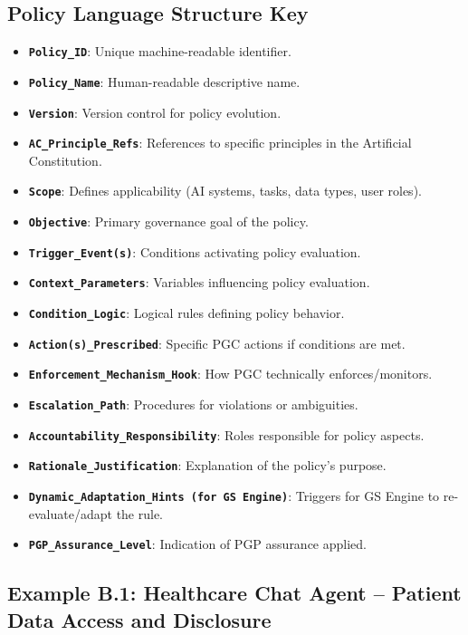 \documentclass[sigconf,review,anonymous=false]{acmart} %
\begin{document}
\subsection{Policy Language Structure Key}
\label{app:policy_examples_structure}
\begin{itemize}
    \item \textbf{\texttt{Policy\_ID}}: Unique machine-readable identifier.
    \item \textbf{\texttt{Policy\_Name}}: Human-readable descriptive name.
    \item \textbf{\texttt{Version}}: Version control for policy evolution.
    \item \textbf{\texttt{AC\_Principle\_Refs}}: References to specific principles in the Artificial Constitution.
    \item \textbf{\texttt{Scope}}: Defines applicability (AI systems, tasks, data types, user roles).
    \item \textbf{\texttt{Objective}}: Primary governance goal of the policy.
    \item \textbf{\texttt{Trigger\_Event(s)}}: Conditions activating policy evaluation.
    \item \textbf{\texttt{Context\_Parameters}}: Variables influencing policy evaluation.
    \item \textbf{\texttt{Condition\_Logic}}: Logical rules defining policy behavior.
    \item \textbf{\texttt{Action(s)\_Prescribed}}: Specific PGC actions if conditions are met.
    \item \textbf{\texttt{Enforcement\_Mechanism\_Hook}}: How PGC technically enforces/monitors.
    \item \textbf{\texttt{Escalation\_Path}}: Procedures for violations or ambiguities.
    \item \textbf{\texttt{Accountability\_Responsibility}}: Roles responsible for policy aspects.
    \item \textbf{\texttt{Rationale\_Justification}}: Explanation of the policy's purpose.
    \item \textbf{\texttt{Dynamic\_Adaptation\_Hints (for GS Engine)}}: Triggers for GS Engine to re-evaluate/adapt the rule.
    \item \textbf{\texttt{PGP\_Assurance\_Level}}: Indication of PGP assurance applied.
\end{itemize}

\subsection{Example B.1: Healthcare Chat Agent – Patient Data Access and Disclosure}
\label{app:policy_example_healthcare}
\end{document}
